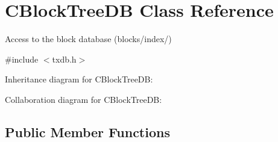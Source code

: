\hypertarget{class_c_block_tree_d_b}{}\section{C\+Block\+Tree\+D\+B Class Reference}
\label{class_c_block_tree_d_b}


Access to the block database (blocks/index/)  




{\ttfamily \#include $<$txdb.\+h$>$}



Inheritance diagram for C\+Block\+Tree\+D\+B\+:


Collaboration diagram for C\+Block\+Tree\+D\+B\+:
\subsection*{Public Member Functions}
